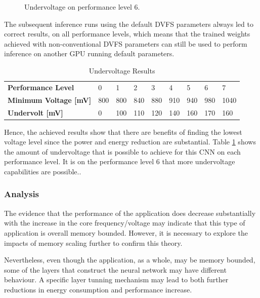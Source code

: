 \begin{figure}[!htb]
\begin{minipage}{.49\textwidth}
    \end{minipage}
    \caption{Undervoltage on performance level 6.}
    \label{fig:under6}
\end{figure}

The subsequent inference runs using the default DVFS parameters always led to correct results, on all performance levels, which means that the trained weights achieved with non-conventional DVFS parameters can still be used to perform inference on another GPU running default parameters.

\begin{table}[!htb]
\centering
\begin{tabular}{l|llllllll}
\textbf{Performance Level}  & 0   & 1   & 2   & 3   & 4   & 5   & 6   & 7    \\
\textbf{Minimum Voltage [mV]}    & 800 & 800 & 840 & 880 & 910 & 940 & 980 & 1040 \\
\textbf{Undervolt {[}mV{]}} & 0   & 100 & 110 & 120 & 140 & 160 & 170 & 160 
\end{tabular}
\caption{Undervoltage Results}
\label{tab:undervoltage-res}
\end{table}

Hence, the achieved results show that there are benefits of finding the lowest voltage level since the power and energy reduction are substantial. Table \ref{tab:undervoltage-res} shows the amount of undervoltage that is possible to achieve for this CNN on each performance level. It is on the performance level 6 that more undervoltage capabilities are possible..



\subsubsection{Analysis}
The evidence that the performance of the application does decrease substantially with the increase in the core frequency/voltage may indicate that this type of application is overall memory bounded. However, it is necessary to explore the impacts of memory scaling further to confirm this theory. 

Nevertheless, even though the application, as a whole, may be memory bounded, some of the layers that construct the neural network may have different behaviour. A specific layer tunning mechanism may lead to both further reductions in energy consumption and performance increase.